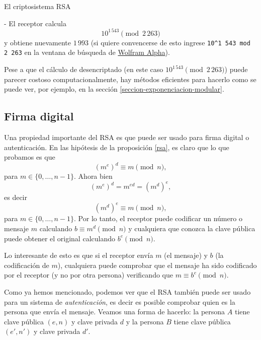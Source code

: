 \begin{section}{El criptosistema RSA}
\begin{ejemplo*}
- El receptor calcula
$$
10^{1\,543} \pmod{2\,263}
$$ 
y obtiene nuevamente $1\,993$ (si quiere convencerse de esto ingrese \texttt{10\^{}1\,543 mod 2\,263} en la ventana de búsqueda de \href{https://www.wolframalpha.com}{Wolfram Alpha}).

Pese a que el cálculo de desencriptado (en este caso $10^{1\,543} \pmod{2\,263}$) puede parecer costoso computacionalmente, hay métodos eficientes para hacerlo como se puede ver, por ejemplo, en la sección \ref{seccion-exponenciacion-modular}. 

\end{ejemplo*}

\subsection*{Firma digital}
Una propiedad importante del RSA es que puede ser usado para firma digital o autenticación. En las hipótesis de la proposición \ref{rsa}, es claro que lo que probamos es que 
$$
(m^e)^d \equiv m \pmod{n},
$$
para $m \in \{0,\ldots,n-1\}$. Ahora bien 
$$
(m^e)^d  = m^{ed} = (m^d)^e,  
$$
es decir
$$
(m^d)^e \equiv m \pmod{n}, 
$$
para $m \in \{0,\ldots,n-1\}$. Por lo tanto, el receptor puede codificar un número o mensaje $m$ calculando  $b \equiv m^d  \pmod{n}$ y cualquiera que conozca la clave pública puede obtener el original calculando $b^e \pmod{n}$. 

Lo interesante de esto es que si el receptor envía $m$ (el mensaje) y $b$ (la codificación de $m$), cualquiera puede comprobar que el mensaje ha sido codificado por el receptor (y no por otra persona) verificando  que   $m \equiv b^e \pmod{n}$.     


\begin{ejemplo*}
Como ya hemos mencionado, podemos ver que el RSA también puede ser usado para un sistema de \emph{autenticación}, es decir es posible comprobar quien es la persona que envía el mensaje. Veamos una forma de hacerlo: la persona $A$ tiene clave pública $(e,n)$ y clave privada $d$ y   la persona $B$  tiene clave pública $(e',n')$ y clave privada $d'$. 


\end{ejemplo*}
\end{section}
